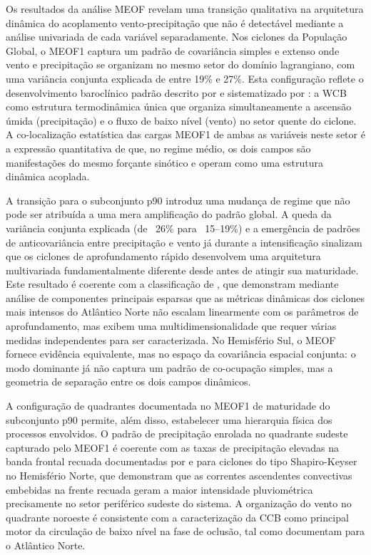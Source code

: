 Os resultados da análise MEOF revelam uma transição qualitativa na arquitetura dinâmica do acoplamento vento-precipitação que não é detectável mediante a análise univariada de cada variável separadamente. 
Nos ciclones da População Global, o MEOF1 captura um padrão de covariância simples e extenso onde vento e precipitação se organizam no mesmo setor do domínio lagrangiano, com uma variância conjunta explicada de entre 19\% e 27\%. 
Esta configuração reflete o desenvolvimento baroclínico padrão descrito por \citet{bjerknes1922life} e sistematizado por \citet{browning1986conceptual}: a WCB como estrutura termodinâmica única que organiza simultaneamente a ascensão úmida (precipitação) e o fluxo de baixo nível (vento) no setor quente do ciclone. 
A co-localização estatística das cargas MEOF1 de ambas as variáveis neste setor é a expressão quantitativa de que, no regime médio, os dois campos são manifestações do mesmo forçante sinótico e operam como uma estrutura dinâmica acoplada.

A transição para o subconjunto p90 introduz uma mudança de regime que não pode ser atribuída a uma mera amplificação do padrão global. 
A queda da variância conjunta explicada (de ~26\% para ~15--19\%) e a emergência de padrões de anticovariância entre precipitação e vento já durante a intensificação sinalizam que os ciclones de aprofundamento rápido desenvolvem uma arquitetura multivariada fundamentalmente diferente desde antes de atingir sua maturidade.
Este resultado é coerente com a classificação de \citet{corner2025classification}, que demonstram mediante análise de componentes principais esparsas que as métricas dinâmicas dos ciclones mais intensos do Atlântico Norte não escalam linearmente com os parâmetros de aprofundamento, mas exibem uma multidimensionalidade que requer várias medidas independentes para ser caracterizada.
No Hemisfério Sul, o MEOF fornece evidência equivalente, mas no espaço da covariância espacial conjunta: o modo dominante já não captura um padrão de co-ocupação simples, mas a geometria de separação entre os dois campos dinâmicos.

A configuração de quadrantes documentada no MEOF1 de maturidade do subconjunto p90 permite, além disso, estabelecer uma hierarquia física dos processos envolvidos.
O padrão de precipitação enrolada no quadrante sudeste capturado pelo MEOF1 é coerente com as taxas de precipitação elevadas na banda frontal recuada documentadas por \citet{clark2005sting} e \citet{oertel2021warm} para ciclones do tipo Shapiro-Keyser no Hemisfério Norte, que demonstram que as correntes ascendentes convectivas embebidas na frente recuada geram a maior intensidade pluviométrica precisamente no setor periférico sudeste do sistema. 
A organização do vento no quadrante noroeste é consistente com a caracterização da CCB como principal motor da circulação de baixo nível na fase de oclusão, tal como documentam \citet{eisenstein2023identification} para o Atlântico Norte. 

